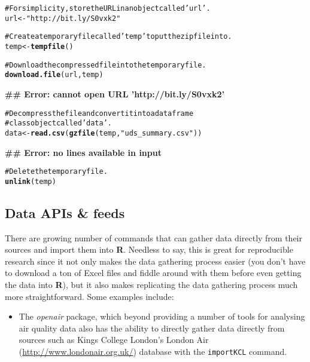 \documentclass[ChapterTOCs,krantz1]{krantz}\usepackage{graphicx, color}
\makeatletter
\newcommand{\hlfunctioncall}[1]{\textcolor[rgb]{0.501960784313725,0,0.329411764705882}{\textbf{#1}}}%
\newcommand{\hlstring}[1]{\textcolor[rgb]{0.6,0.6,1}{#1}}%
\newcommand{\hlcomment}[1]{\textcolor[rgb]{0.180392156862745,0.6,0.341176470588235}{#1}}%
\newenvironment{kframe}{%
 \def\at@end@of@kframe{}%
 \ifinner\ifhmode%
  \def\at@end@of@kframe{\end{minipage}}%
  \begin{minipage}{\columnwidth}%
 \fi\fi%
 \def\FrameCommand##1{\hskip\@totalleftmargin \hskip-\fboxsep
 \colorbox{shadecolor}{##1}\hskip-\fboxsep
     \hskip-\linewidth \hskip-\@totalleftmargin \hskip\columnwidth}%
 \MakeFramed {\advance\hsize-\width
   \@totalleftmargin\z@ \linewidth\hsize
   \@setminipage}}%
 {\par\unskip\endMakeFramed%
 \at@end@of@kframe}
\newenvironment{knitrout}{}{} %
\makeatother
\begin{document}
\begin{knitrout}
\color{fgcolor}\begin{kframe}
\begin{alltt}
\hlcomment{# For simplicity, store the URL in an object called \hlstring{'url'}.}
url <- \hlstring{"http://bit.ly/S0vxk2"}

\hlcomment{# Create a temporary file called \hlstring{'temp'} to put the zip file into.}
temp <- \hlfunctioncall{tempfile}()

\hlcomment{# Download the compressed file into the temporary file.}
\hlfunctioncall{download.file}(url, temp)
\end{alltt}


{\ttfamily\noindent\bfseries\textcolor{errorcolor}{\#\# Error: cannot open URL 'http://bit.ly/S0vxk2'}}\begin{alltt}

\hlcomment{# Decompress the file and convert it into a dataframe}
\hlcomment{# class object called \hlstring{'data'}.}
data <- \hlfunctioncall{read.csv}(\hlfunctioncall{gzfile}(temp, \hlstring{"uds_summary.csv"}))
\end{alltt}


{\ttfamily\noindent\bfseries\textcolor{errorcolor}{\#\# Error: no lines available in input}}\begin{alltt}

\hlcomment{# Delete the temporary file.}
\hlfunctioncall{unlink}(temp)
\end{alltt}
\end{kframe}
\end{knitrout}


\subsection{Data APIs \& feeds}

There are growing number of commands that can gather data directly from
their sources and import them into \textbf{R}. Needless to say, this is
great for reproducible research since it not only makes the data
gathering process easier (you don't have to download a ton of Excel
files and fiddle around with them before even getting the data into
\textbf{R}), but it also makes replicating the data gathering process
much more straightforward. Some examples include:

\begin{itemize}
    \item The \emph{openair} package, which beyond providing a number of tools for analysing air quality data also has the ability to directly gather data directly from sources such as Kings College London's London Air (\url{http://www.londonair.org.uk/}) database with the \texttt{importKCL} command.
\end{itemize}
\end{document}

